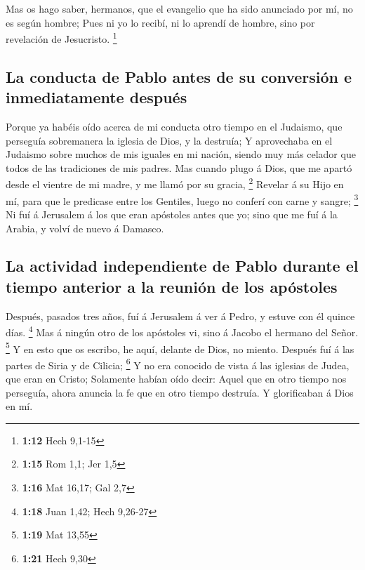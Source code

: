  Mas os hago saber, hermanos, que el evangelio que ha
sido anunciado por mí, no es según hombre;  Pues ni yo lo
recibí, ni lo aprendí de hombre, sino por revelación de Jesucristo.
\footnote{\textbf{1:12} Hech 9,1-15}

\hypertarget{la-conducta-de-pablo-antes-de-su-conversiuxf3n-e-inmediatamente-despuuxe9s}{%
\subsection{La conducta de Pablo antes de su conversión e inmediatamente
después}\label{la-conducta-de-pablo-antes-de-su-conversiuxf3n-e-inmediatamente-despuuxe9s}}

 Porque ya habéis oído acerca de mi conducta otro tiempo
en el Judaismo, que perseguía sobremanera la iglesia de Dios, y la
destruía;  Y aprovechaba en el Judaismo sobre muchos de
mis iguales en mi nación, siendo muy más celador que todos de las
tradiciones de mis padres.  Mas cuando plugo á Dios, que
me apartó desde el vientre de mi madre, y me llamó por su gracia,
\footnote{\textbf{1:15} Rom 1,1; Jer 1,5}  Revelar á su
Hijo en mí, para que le predicase entre los Gentiles, luego no conferí
con carne y sangre; \footnote{\textbf{1:16} Mat 16,17; Gal 2,7}
 Ni fuí á Jerusalem á los que eran apóstoles antes que
yo; sino que me fuí á la Arabia, y volví de nuevo á Damasco.

\hypertarget{la-actividad-independiente-de-pablo-durante-el-tiempo-anterior-a-la-reuniuxf3n-de-los-apuxf3stoles}{%
\subsection{La actividad independiente de Pablo durante el tiempo
anterior a la reunión de los
apóstoles}\label{la-actividad-independiente-de-pablo-durante-el-tiempo-anterior-a-la-reuniuxf3n-de-los-apuxf3stoles}}

 Después, pasados tres años, fuí á Jerusalem á ver á
Pedro, y estuve con él quince días. \footnote{\textbf{1:18} Juan 1,42;
  Hech 9,26-27}  Mas á ningún otro de los apóstoles vi,
sino á Jacobo el hermano del Señor. \footnote{\textbf{1:19} Mat 13,55}
 Y en esto que os escribo, he aquí, delante de Dios, no
miento.  Después fuí á las partes de Siria y de Cilicia;
\footnote{\textbf{1:21} Hech 9,30}  Y no era conocido de
vista á las iglesias de Judea, que eran en Cristo; 
Solamente habían oído decir: Aquel que en otro tiempo nos perseguía,
ahora anuncia la fe que en otro tiempo destruía.  Y
glorificaban á Dios en mí.

